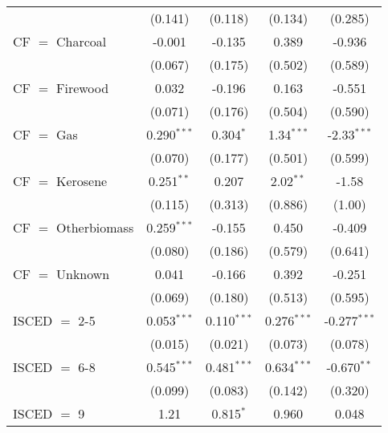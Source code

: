 \begin{table}[htbp!]
\begin{adjustbox}{width = 1\textwidth, max height = 0.95\textheight, center}
\begin{threeparttable}[b]
\begin{tabular}{lcccc}
                                 & (0.141)            & (0.118)            & (0.134)       & (0.285)\\   
            CF $=$ Charcoal      & -0.001             & -0.135             & 0.389         & -0.936\\   
                                 & (0.067)            & (0.175)            & (0.502)       & (0.589)\\   
            CF $=$ Firewood      & 0.032              & -0.196             & 0.163         & -0.551\\   
                                 & (0.071)            & (0.176)            & (0.504)       & (0.590)\\   
            CF $=$ Gas           & 0.290$^{***}$      & 0.304$^{*}$        & 1.34$^{***}$  & -2.33$^{***}$\\   
                                 & (0.070)            & (0.177)            & (0.501)       & (0.599)\\   
            CF $=$ Kerosene      & 0.251$^{**}$       & 0.207              & 2.02$^{**}$   & -1.58\\   
                                 & (0.115)            & (0.313)            & (0.886)       & (1.00)\\   
            CF $=$ Otherbiomass  & 0.259$^{***}$      & -0.155             & 0.450         & -0.409\\   
                                 & (0.080)            & (0.186)            & (0.579)       & (0.641)\\   
            CF $=$ Unknown       & 0.041              & -0.166             & 0.392         & -0.251\\   
                                 & (0.069)            & (0.180)            & (0.513)       & (0.595)\\   
            ISCED $=$ 2-5        & 0.053$^{***}$      & 0.110$^{***}$      & 0.276$^{***}$ & -0.277$^{***}$\\   
                                 & (0.015)            & (0.021)            & (0.073)       & (0.078)\\   
            ISCED $=$ 6-8        & 0.545$^{***}$      & 0.481$^{***}$      & 0.634$^{***}$ & -0.670$^{**}$\\   
                                 & (0.099)            & (0.083)            & (0.142)       & (0.320)\\   
            ISCED $=$ 9          & 1.21               & 0.815$^{*}$        & 0.960         & 0.048\\   

\end{tabular}
\end{threeparttable}
\end{adjustbox}
\end{table}
